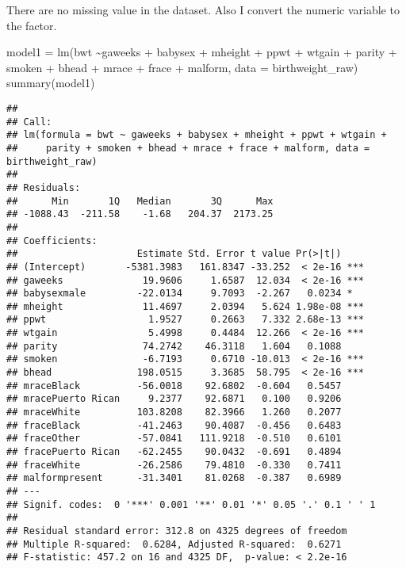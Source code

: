 \documentclass[
]{article}
\newenvironment{Shaded}{\begin{snugshade}}{\end{snugshade}}
\newcommand{\AttributeTok}[1]{\textcolor[rgb]{0.77,0.63,0.00}{#1}}
\newcommand{\FunctionTok}[1]{\textcolor[rgb]{0.00,0.00,0.00}{#1}}
\newcommand{\NormalTok}[1]{#1}
\newcommand{\OtherTok}[1]{\textcolor[rgb]{0.56,0.35,0.01}{#1}}
\newcommand{\SpecialCharTok}[1]{\textcolor[rgb]{0.00,0.00,0.00}{#1}}
\begin{document}
There are no missing value in the dataset. Also I convert the numeric
variable to the factor.

\begin{Shaded}
\begin{Highlighting}[]
\NormalTok{model1 }\OtherTok{=} \FunctionTok{lm}\NormalTok{(bwt }\SpecialCharTok{\textasciitilde{}}\NormalTok{gaweeks }\SpecialCharTok{+}\NormalTok{ babysex }\SpecialCharTok{+}\NormalTok{ mheight }\SpecialCharTok{+}\NormalTok{ ppwt }\SpecialCharTok{+}\NormalTok{ wtgain }\SpecialCharTok{+}\NormalTok{ parity }\SpecialCharTok{+}\NormalTok{ smoken }\SpecialCharTok{+}\NormalTok{ bhead }\SpecialCharTok{+}\NormalTok{ mrace }\SpecialCharTok{+}\NormalTok{ frace }\SpecialCharTok{+}\NormalTok{ malform, }\AttributeTok{data =}\NormalTok{ birthweight\_raw)}
\FunctionTok{summary}\NormalTok{(model1)}
\end{Highlighting}
\end{Shaded}

\begin{verbatim}
## 
## Call:
## lm(formula = bwt ~ gaweeks + babysex + mheight + ppwt + wtgain + 
##     parity + smoken + bhead + mrace + frace + malform, data = birthweight_raw)
## 
## Residuals:
##      Min       1Q   Median       3Q      Max 
## -1088.43  -211.58    -1.68   204.37  2173.25 
## 
## Coefficients:
##                     Estimate Std. Error t value Pr(>|t|)    
## (Intercept)       -5381.3983   161.8347 -33.252  < 2e-16 ***
## gaweeks              19.9606     1.6587  12.034  < 2e-16 ***
## babysexmale         -22.0134     9.7093  -2.267   0.0234 *  
## mheight              11.4697     2.0394   5.624 1.98e-08 ***
## ppwt                  1.9527     0.2663   7.332 2.68e-13 ***
## wtgain                5.4998     0.4484  12.266  < 2e-16 ***
## parity               74.2742    46.3118   1.604   0.1088    
## smoken               -6.7193     0.6710 -10.013  < 2e-16 ***
## bhead               198.0515     3.3685  58.795  < 2e-16 ***
## mraceBlack          -56.0018    92.6802  -0.604   0.5457    
## mracePuerto Rican     9.2377    92.6871   0.100   0.9206    
## mraceWhite          103.8208    82.3966   1.260   0.2077    
## fraceBlack          -41.2463    90.4087  -0.456   0.6483    
## fraceOther          -57.0841   111.9218  -0.510   0.6101    
## fracePuerto Rican   -62.2455    90.0432  -0.691   0.4894    
## fraceWhite          -26.2586    79.4810  -0.330   0.7411    
## malformpresent      -31.3401    81.0268  -0.387   0.6989    
## ---
## Signif. codes:  0 '***' 0.001 '**' 0.01 '*' 0.05 '.' 0.1 ' ' 1
## 
## Residual standard error: 312.8 on 4325 degrees of freedom
## Multiple R-squared:  0.6284, Adjusted R-squared:  0.6271 
## F-statistic: 457.2 on 16 and 4325 DF,  p-value: < 2.2e-16
\end{verbatim}
\end{document}
